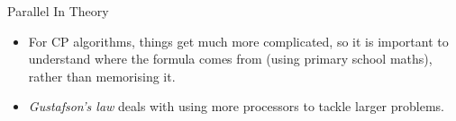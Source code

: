 \documentclass{beamer}
\begin{document}
\begin{frame}{Parallel In Theory}
{\begin{itemize}
            \item For CP algorithms, things get much more complicated, so it is important to understand
                where the formula comes from (using primary school maths), rather than memorising it.

            \item \emph{Gustafson's law} deals with using more processors to tackle larger problems.
        \end{itemize}
    }

\end{frame}
\end{document}
